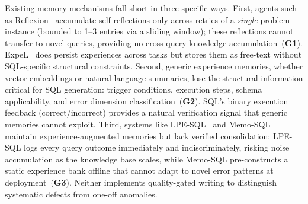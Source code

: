 
Existing memory mechanisms fall short in three specific ways. 
First, agents such as Reflexion~\cite{shinn2023reflexion} accumulate self-reflections only across retries of a \emph{single} problem instance (bounded to 1--3 entries via a sliding window); these reflections cannot transfer to novel queries, providing no cross-query knowledge accumulation~(\textbf{G1}). ExpeL~\cite{zhao2023expel} does persist experiences across tasks but stores them as free-text without SQL-specific structural constraints. 
Second, generic experience memories, whether vector embeddings or natural language summaries, lose the structural information critical for SQL generation: trigger conditions, execution steps, schema applicability, and error dimension classification~(\textbf{G2}). 
SQL's binary execution feedback (correct/incorrect) provides a natural verification signal that generic memories cannot exploit. 
Third, systems like LPE-SQL~\cite{chu2024lpesql} and Memo-SQL~\cite{yang2026memosql} maintain experience-augmented memories but lack verified consolidation: LPE-SQL logs every query outcome immediately and indiscriminately, risking noise accumulation as the knowledge base scales, while Memo-SQL pre-constructs a static experience bank offline that cannot adapt to novel error patterns at deployment~(\textbf{G3}). 
Neither implements quality-gated writing to distinguish systematic defects from one-off anomalies.



